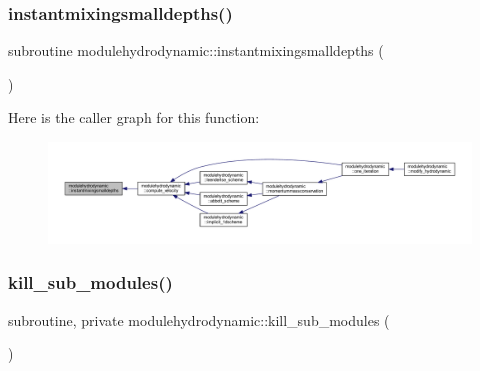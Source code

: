 \subsubsection{\texorpdfstring{instantmixingsmalldepths()}{instantmixingsmalldepths()}}
{\footnotesize\ttfamily subroutine modulehydrodynamic\+::instantmixingsmalldepths (\begin{DoxyParamCaption}{ }\end{DoxyParamCaption})\hspace{0.3cm}{\ttfamily [private]}}

Here is the caller graph for this function\+:\nopagebreak
\begin{figure}[H]
\begin{center}
\leavevmode
\includegraphics[width=350pt]{namespacemodulehydrodynamic_a2237f44be04f4c5aeac0890ddec1ce4b_icgraph}
\end{center}
\end{figure}
\mbox{\label{namespacemodulehydrodynamic_ad33fcf640ab52de6097223c4aeb342c0}} 
\subsubsection{\texorpdfstring{kill\+\_\+sub\+\_\+modules()}{kill\_sub\_modules()}}
{\footnotesize\ttfamily subroutine, private modulehydrodynamic\+::kill\+\_\+sub\+\_\+modules (\begin{DoxyParamCaption}{ }\end{DoxyParamCaption})\hspace{0.3cm}{\ttfamily [private]}}

